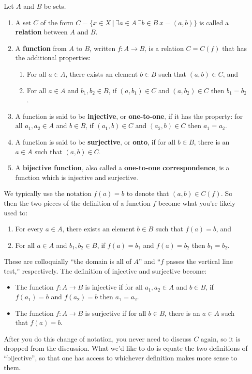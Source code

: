 \begin{definition} \label{def:bijective_function} Let $A$ and $B$ be sets.
\begin{enumerate}
    \item A set $C$ of the form $C=\{x\in X\ |\ \exists a\in A\ \exists b\in B\ x = (a,b)\}$ is called a \textbf{relation} between $A$ and $B$.
    \item  A \textbf{function} from $A$ to $B$, written $f:A\to B$, is a relation $C = C(f)$ that has the additional properties:
    \begin{enumerate}
        \item For all $a \in A$, there exists an element $b\in B$ such that $(a,b)\in C$, and
        \item For all $a \in A$ and $b_1, b_2 \in B$, if $(a,b_1)\in C$ and $(a,b_2)\in C$ then $b_1 = b_2$.
    \end{enumerate}
    \item A function is said to be \textbf{injective}, or \textbf{one-to-one}, if it has the property: for all $a_1, a_2 \in A$ and $b\in B$, if $(a_1,b)\in C$ and $(a_2,b)\in C$ then $a_1 = a_2$.
    \item A function is said to be \textbf{surjective}, or \textbf{onto}, if for all $b \in B$, there is an $a\in A$ such that $(a, b)\in C$.
    \item A \textbf{bijective function}, also called a \textbf{one-to-one correspondence}, is a function which is injective and surjective.
\end{enumerate}
\end{definition}

We typically use the notation $f(a) = b$ to denote that $(a,b)\in C(f)$.  So then the two pieces of the definition of a function $f$ become what you're likely used to:
\renewcommand{\theenumi}{\alph{enumi}}
\begin{enumerate}
    \item For every $a \in A$, there exists an element $b\in B$ such that $f(a)=b$, and
    \item For all $a \in A$ and $b_1, b_2 \in B$, if $f(a) =b_1$ and $f(a) = b_2$ then $b_1 = b_2$.
\end{enumerate}
These are colloquially ``the domain is all of $A$'' and ``$f$ passes the vertical line test,'' respectively.  The definition of injective and surjective become:
\begin{itemize}
    \item The function $f:A\to B$ is injective if for all $a_1, a_2 \in A$ and $b\in B$, if $f(a_1)=b$ and $f(a_2) = b$ then $a_1 = a_2$.
    \item The function $f:A\to B$ is surjective if for all $b \in B$, there is an $a\in A$ such that $f(a)= b$.
\end{itemize}
After you do this change of notation, you never need to discuss $C$ again, so it is dropped from the discussion.  What we'd like to do is equate the two definitions of ``bijective'', so that one has access to whichever definition makes more sense to them.

